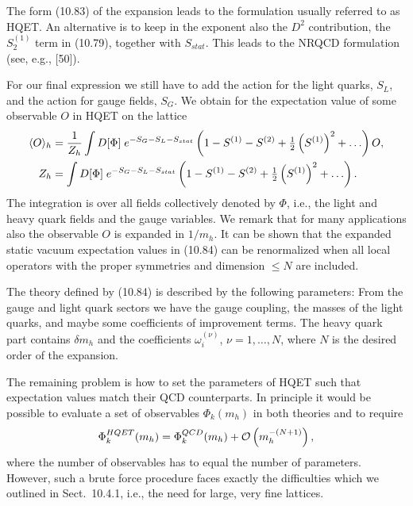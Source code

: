 The form (10.83) of the expansion leads to the formulation usually referred to
as HQET. An alternative is to keep in the exponent also the $D^2$ contribution,
the $S_2^{(1)}$ term in (10.79), together with $S_{stat}$. This leads to the
NRQCD formulation (see, e.g., [50]).

For our final expression we still have to add the action for the light quarks,
$S_L$, and the action for gauge fields, $S_G$. We obtain for the expectation
value of some observable $O$ in HQET on the lattice
\begin{equation}
  \begin{split}
    \langle O\rangle_h &= \frac{1}{Z_h}
    \int D[\Phi]\; e^{-S_G - S_L - S_{stat}}
    \left(1 - S^{(1)} - S^{(2)}
    + \tfrac{1}{2}\left(S^{(1)}\right)^2 + \ldots\right)O , \\
    Z_h &= \int D[\Phi]\; e^{-S_G - S_L - S_{stat}}
    \left(1 - S^{(1)} - S^{(2)}
    + \tfrac{1}{2}\left(S^{(1)}\right)^2 + \ldots\right) .
  \end{split}
\end{equation}
The integration is over all fields collectively denoted by $\Phi$, i.e., the
light and heavy quark fields and the gauge variables. We remark that for many
applications also the observable $O$ is expanded in $1/m_h$. It can be shown
that the expanded static vacuum expectation values in (10.84) can be
renormalized when all local operators with the proper symmetries and dimension
$\leq N$ are included.

The theory defined by (10.84) is described by the following parameters: From
the gauge and light quark sectors we have the gauge coupling, the masses of
the light quarks, and maybe some coefficients of improvement terms. The heavy
quark part contains $\delta m_h$ and the coefficients $\omega_i^{(\nu)}$,
$\nu = 1, \ldots, N$, where $N$ is the desired order of the expansion.

The remaining problem is how to set the parameters of HQET such that
expectation values match their QCD counterparts. In principle it would be
possible to evaluate a set of observables $\Phi_k(m_h)$ in both theories and
to require
\begin{equation}
  \Phi_k^{HQET}(m_h) = \Phi_k^{QCD}(m_h) + \mathcal{O}\left(m_h^{-(N+1)}\right) ,
\end{equation}
where the number of observables has to equal the number of parameters.
However, such a brute force procedure faces exactly the difficulties which we
outlined in Sect.~10.4.1, i.e., the need for large, very fine lattices.

